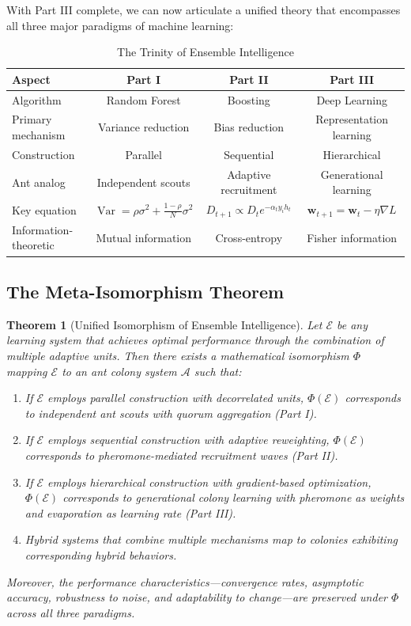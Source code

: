\documentclass[12pt,letterpaper]{article}
\DeclareMathOperator{\Var}{Var}
\newtheorem{theorem}{Theorem}[section]
\begin{document}
With Part III complete, we can now articulate a unified theory that encompasses all three major paradigms of machine learning:

\begin{table}[htbp]
\centering
\caption{The Trinity of Ensemble Intelligence}
\label{tab:trinity}
\begin{tabular}{lccc}
\toprule
\textbf{Aspect} & \textbf{Part I} & \textbf{Part II} & \textbf{Part III} \\
\midrule
Algorithm & Random Forest & Boosting & Deep Learning \\
Primary mechanism & Variance reduction & Bias reduction & Representation learning \\
Construction & Parallel & Sequential & Hierarchical \\
Ant analog & Independent scouts & Adaptive recruitment & Generational learning \\
Key equation & $\Var = \rho\sigma^2 + \frac{1-\rho}{N}\sigma^2$ & $D_{t+1} \propto D_t e^{-\alpha_t y_i h_t}$ & $\mathbf{w}_{t+1} = \mathbf{w}_t - \eta \nabla L$ \\
Information-theoretic & Mutual information & Cross-entropy & Fisher information \\
\bottomrule
\end{tabular}
\end{table}

\subsection{The Meta-Isomorphism Theorem}

\begin{theorem}[Unified Isomorphism of Ensemble Intelligence]
Let $\mathcal{E}$ be any learning system that achieves optimal performance through the combination of multiple adaptive units. Then there exists a mathematical isomorphism $\Phi$ mapping $\mathcal{E}$ to an ant colony system $\mathcal{A}$ such that:

\begin{enumerate}
    \item If $\mathcal{E}$ employs parallel construction with decorrelated units, $\Phi(\mathcal{E})$ corresponds to independent ant scouts with quorum aggregation (Part I).
    \item If $\mathcal{E}$ employs sequential construction with adaptive reweighting, $\Phi(\mathcal{E})$ corresponds to pheromone-mediated recruitment waves (Part II).
    \item If $\mathcal{E}$ employs hierarchical construction with gradient-based optimization, $\Phi(\mathcal{E})$ corresponds to generational colony learning with pheromone as weights and evaporation as learning rate (Part III).
    \item Hybrid systems that combine multiple mechanisms map to colonies exhibiting corresponding hybrid behaviors.
\end{enumerate}

Moreover, the performance characteristics—convergence rates, asymptotic accuracy, robustness to noise, and adaptability to change—are preserved under $\Phi$ across all three paradigms.
\end{theorem}
\end{document}
